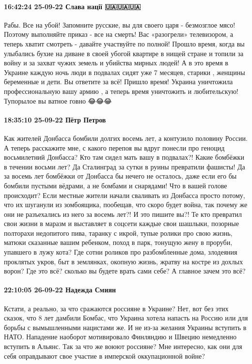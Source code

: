 \paragraph{16:42:24 25-09-22 Слава нації 🇺🇦🇺🇦🇺🇦}

Рабы. Все на убой!
Запомните русские, вы для своего царя - безмозглое мясо!
Поэтому выполняйте приказ - все на смерть!
Вас «разогрели» телевизором, а теперь хватит смотреть - давайте участвуйте по полной! Прошло время, когда вы улыбались бухие на диване в своей убогой квартире в нищей стране и топили за войну и за захват чужих земель и убийства мирных людей! А в это время в Украине каждую ночь люди в подвалах сидят уже 7 месяцев, старики , женщины беременные и дети.
Вы ответите за всё! Пришло время!
Украина уничтожила профессиональную вашу армию , а теперь время уничтожить и любительскую! Тупорылое вы ватное говно 😂😂😂


\paragraph{18:35:10 25-09-22 Пётр Петров}

Как жителей Донбасса бомбили долгих восемь лет, а контузило половину России. А теперь расскажите мне, с какого перепоя вы вдруг понесли про геноцид восьмилетний Донбасса? Кто там сидел мать вашу в подвалах?! Какие бомбёжки в течении восьми лет?
Да Сталинград за сутки в руины превратили фашисты! Да за восемь лет бомбёжки от Донбасса бы нечего не осталось, даже если его бы бомбили пустыми вёдрами, а не бомбами и снарядами! Что в вашей голове происходит?
Если местные жители начали сваливать из Донбасса просто потому, что их шуганули из зомбоящика, пообещав, что скоро будет война, так почему же они не разъехались из него за восемь лет?!
И это пишите вы?! Те кто превратил свои жизни в маразм и выставляет в соцсети каждые свои шашлыки, позорные полторахи недопитого пива, таранку с икрой, тупые ролики про свою жизнь, матюки сказанные вашим ребенком, поход в парк, тонущую жену в проруби, упавшего в лужу кота?
Где сотни роликов про разбомбленные дома, злодеяния проклятых укров, быт в землянках, окопную жизнь, жратву на костре из дохлых ворон? Где это всё? сколько вы будете врать сами себе? А главное зачем это всё?

\paragraph{22:10:05 26-09-22 Надежда Смиян}

Кстати, а реально, за что сражаются россияне в Украине? Нет, вот без этих
сказок, что 8 лет дамбили Бомбас, что Украина хотела напасть на Россию или для
борьбы с вымышленными нацистами же. И не из-за желания Украины вступить в НАТО.
Нападение наоборот мотивировало Финляндию и Швецию немедленно вступить в
Альянс. Так за что же воюют россияне? Мне интересно, как они для себя
оправдывают свое участие в имперской оккупационной войне?

